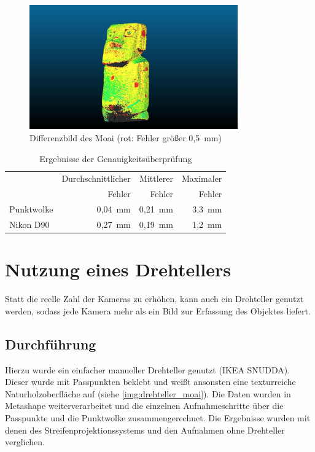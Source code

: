 \documentclass[./00PhotoBox.tex]{subfiles}
\begin{document}
\begin{figure}
    \centering
    \includegraphics[width=0.8\textwidth]{img/moai_fehler.jpg}
    \caption{Differenzbild des Moai (rot: Fehler größer 0,5~mm)}
    \label{img:differenz_moai}
\end{figure}

\begin{table}
    \centering
    \caption{Ergebnisse der Genauigkeitsüberprüfung}
    \label{tab:vergleich_erg}
    \begin{tabular}{l|r|r|r}
        \toprule
                   & Durchschnittlicher & Mittlerer & Maximaler \\
                   & Fehler             & Fehler    & Fehler    \\
        \midrule
        Punktwolke & 0,04~mm            & 0,21~mm   & 3,3~mm    \\  %
        \midrule
        Nikon D90  & 0,27~mm            & 0,19~mm   & 1,2~mm    \\
        \bottomrule
    \end{tabular}
\end{table}


\section{Nutzung eines Drehtellers}
\label{s:drehteller}
Statt die reelle Zahl der Kameras zu erhöhen, kann auch ein Drehteller genutzt werden, sodass jede Kamera mehr als ein Bild zur Erfassung des Objektes liefert.

\subsection{Durchführung}
Hierzu wurde ein einfacher manueller Drehteller genutzt (IKEA SNUDDA). Dieser wurde mit Passpunkten beklebt und weißt ansonsten eine texturreiche Naturholzoberfläche auf (siehe \autoref{img:drehteller_moai}). Die Daten wurden in Metashape weiterverarbeitet und die einzelnen Aufnahmeschritte über die Passpunkte und die Punktwolke zusammengerechnet. Die Ergebnisse wurden mit denen des Streifenprojektionssystems und den Aufnahmen ohne Drehteller verglichen.
\end{document}
